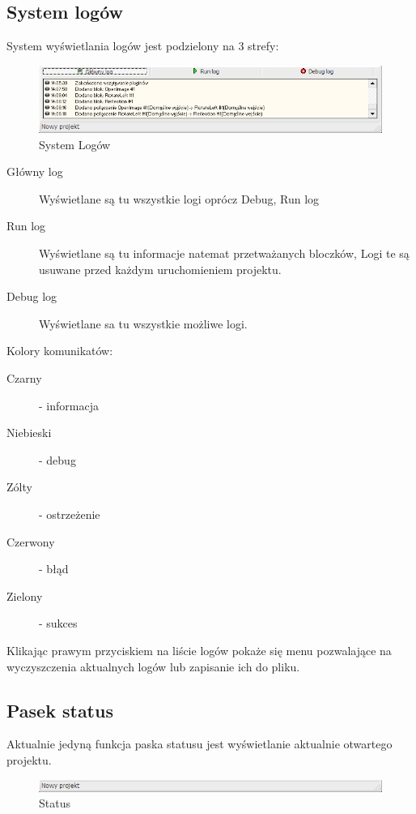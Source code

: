 \documentclass[a4paper,10pt]{article}
\begin{document}
\subsection{System logów}
System wyświetlania logów jest podzielony na 3 strefy:
\begin{figure}[h]
 \centering
 \includegraphics[scale=0.5]{systemlogow}
 \caption{System Logów} 
 \label{fig:systemlogow}
\end{figure}
\begin{description}
 \item[Główny log] Wyświetlane są tu wszystkie logi oprócz Debug, Run log
 \item[Run log] Wyświetlane są tu informacje natemat przetważanych bloczków, Logi te są usuwane przed każdym uruchomieniem projektu.
 \item[Debug log] Wyświetlane sa tu wszystkie możliwe logi.
 \end{description}
Kolory komunikatów:
\begin{description}
 \item[Czarny] - informacja
 \item[Niebieski] - debug
 \item[Zólty] - ostrzeżenie
 \item[Czerwony] - błąd
 \item[Zielony] - sukces
 \end{description}
Klikając prawym przyciskiem na liście logów pokaże się menu pozwalające na wyczyszczenia aktualnych logów lub zapisanie ich do pliku.
\subsection{Pasek status}
Aktualnie jedyną funkcja paska statusu jest wyświetlanie aktualnie otwartego projektu.
\begin{figure}[h]
 \centering
 \includegraphics[scale=0.5]{status}
 \caption{Status}
 \label{fig:Status}
\end{figure}
\end{document}
